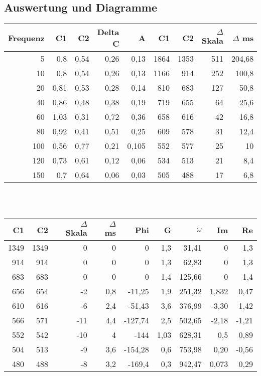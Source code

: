 \subsection{Auswertung und Diagramme}



\begin{tabular}{r|r|r|r|r|r|r|r|r}
Frequenz & C1    & C2    & Delta C & A     & C1    & C2    & $\Delta$ Skala & $\Delta$ ms \\
\hline
5     & 0,8   & 0,54  & 0,26  & 0,13  & 1864  & 1353  & 511   & 204,68 \\
10    & 0,8   & 0,54  & 0,26  & 0,13  & 1166  & 914   & 252   & 100,8 \\
20    & 0,81  & 0,53  & 0,28  & 0,14  & 810   & 683   & 127   & 50,8 \\
40    & 0,86  & 0,48  & 0,38  & 0,19  & 719   & 655   & 64    & 25,6 \\
60    & 1,03  & 0,31  & 0,72  & 0,36  & 658   & 616   & 42    & 16,8 \\
80    & 0,92  & 0,41  & 0,51  & 0,25  & 609   & 578   & 31    & 12,4 \\
100   & 0,56  & 0,77  & 0,21  & 0,105 & 552   & 577   & 25    & 10 \\
120   & 0,73  & 0,61  & 0,12  & 0,06  & 534   & 513   & 21    & 8,4 \\
150   & 0,7   & 0,64  & 0,06  & 0,03  & 505   & 488   & 17    & 6,8 \\
\end{tabular}%

\hfill \\
\hfill \\


\begin{tabular}{r|r|r|r|r|r|r|r|r}
C1    & C2    & $\Delta$ Skala & $\Delta$ ms & Phi   & G     & $\omega$ & Im    & Re \\
\hline
1349  & 1349  & 0     & 0     & 0     & 1,3   & 31,41 & 0     & 1,3 \\
914   & 914   & 0     & 0     & 0     & 1,3   & 62,83 & 0     & 1,3 \\
683   & 683   & 0     & 0     & 0     & 1,4   & 125,66 & 0     & 1,4 \\
656   & 654   & -2    & 0,8   & -11,25 & 1,9   & 251,32 & 1,832 & 0,47 \\
610   & 616   & -6    & 2,4   & -51,43 & 3,6   & 376,99 & -3,30 & 1,42 \\
566   & 571   & -11   & 4,4   & -127,74 & 2,5   & 502,65 & -2,18 & -1,21 \\
552   & 542   & -10   & 4     & -144  & 1,03  & 628,31 & 0,5 & 0,89 \\
504   & 513   & -9    & 3,6   & -154,28 & 0,6   & 753,98 & 0,20 & -0,56 \\
480   & 488   & -8    & 3,2   & -169,4 & 0,3   & 942,47 & 0,073 & 0,29 \\
\end{tabular}%



